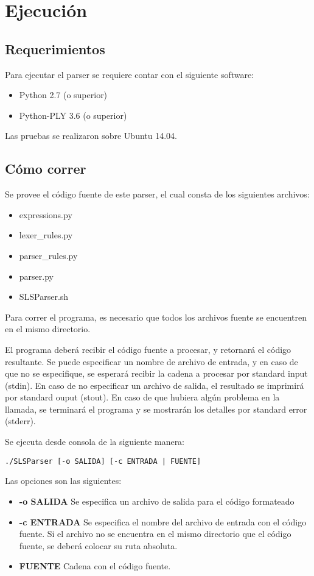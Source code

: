 \section{Ejecución}

\subsection{Requerimientos}

Para ejecutar el parser se requiere contar con el siguiente software:

\begin{itemize}
\item Python 2.7 (o superior)
\item Python-PLY 3.6 (o superior)
\end{itemize}

Las pruebas se realizaron sobre Ubuntu 14.04.

\subsection{Cómo correr}

Se provee el código fuente de este parser, el cual consta de los siguientes archivos:

\begin{itemize}
\item expressions.py
\item lexer_rules.py
\item parser_rules.py
\item parser.py
\item SLSParser.sh
\end{itemize}

Para correr el programa, es necesario que todos los archivos fuente se encuentren en el mismo directorio.

El programa deberá recibir el código fuente a procesar, y retornará el código resultante. Se puede especificar un nombre de archivo de entrada, y en caso de que no se especifique, se esperará recibir la cadena a procesar por standard input (stdin). En caso de no especificar un archivo de salida, el resultado se imprimirá por standard ouput (stout).
En caso de que hubiera algún problema en la llamada, se terminará el programa y se mostrarán los detalles por standard error (stderr). 

Se ejecuta desde consola de la siguiente manera:

{\tt ./SLSParser [-o SALIDA] [-c ENTRADA | FUENTE]}

Las opciones son las siguientes:

\begin{itemize}
\item {\bf -o SALIDA} Se especifica un archivo de salida para el código formateado
\item {\bf -c ENTRADA} Se especifica el nombre del archivo de entrada con el código fuente.  Si el archivo no se encuentra en el mismo directorio que el código fuente, se deberá colocar su ruta absoluta.
\item {\bf FUENTE} Cadena con el código fuente.
\end{itemize}
